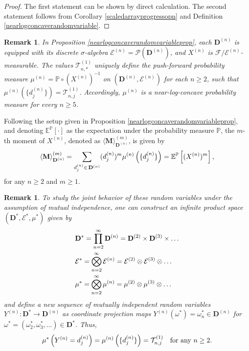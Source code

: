 \documentclass[a4paper,12pt]{article}
\newtheorem{rem}[thm]{Remark}
\def\P{\mathbb{P}}
\def\E{\mathbb{E}}
\def\T{\mathcal{T}}
\def\F{\mathcal{F}}
\begin{document}
\begin{proof}
The first statement can be shown by direct calculation. The second statement follows from Corollary \ref{scaledarrayprogressopn} and Definition \ref{nearlogconcaverandomvariable}.
\end{proof}
\begin{rem}
\label{probmeasure}
In Proposition \ref{nearlogconcaverandomvariableprop}, each $\mathbf{D}^{(n)}$ is equipped with its discrete $\sigma$-algebra $\mathcal{E}^{(n)} = \mathcal{P}(\mathbf{D}^{(n)})$, and $X^{(n)}$ is $\F/\mathcal{E}^{(n)}$-measurable. The values $\T^{(1)}_{n,*}$ uniquely define the push-forward probability measure $\mu^{(n)} = \P \circ (X^{(n)})^{-1}$ on $(\mathbf{D}^{(n)},\mathcal{E}^{(n)})$ for each $n \geq 2$, such that $\mu^{(n)}(\{d^{(n)}_j\}) = \T^{(1)}_{n,j}$. Accordingly, $\mu^{(n)}$ is a near-log-concave probability measure for every $n\geq 5$.
\end{rem}
Following the setup given in Proposition \ref{nearlogconcaverandomvariableprop}, and denoting $\E^{\P}[\cdot]$ as the expectation under the probability measure $\P$, the $m$-th moment of $X^{(n)}$, denoted as $\langle\textbf{M}\rangle_{\mathbf{D}^{(n)}}^{(m)}$, is given by
\begin{align} 
\langle\textbf{M}\rangle_{\mathbf{D}^{(n)}}^{(m)} = \sum_{d^{(n)}_j \in \, \mathbf{D}^{(n)}} (d^{(n)}_j)^m \mu^{(n)}\left( \{d^{(n)}_j\} \right) = \E^{\P}\left[ (X^{(n)})^m \right], \notag  \end{align}
for any $n\geq 2$ and $m\geq 1$. 
\begin{rem}
To study the joint behavior of these random variables under the assumption of mutual independence, one can construct an infinite product space $(\mathbf{D}^*, \mathcal{E}^*, \mu^*)$ given by 
\begin{align}
&\mathbf{D}^* = \prod_{n=2}^{\infty} \mathbf{D}^{(n)} = \mathbf{D}^{(2)} \times \mathbf{D}^{(3)} \times \ldots \notag \\
&\mathcal{E}^* = \bigotimes_{n=2}^{\infty} \mathcal{E}^{(n)} = \mathcal{E}^{(2)} \otimes \mathcal{E}^{(3)} \otimes \ldots \notag \\
&\mu^* = \bigotimes_{n=2}^{\infty} \mu^{(n)} = \mu^{(2)} \otimes \mu^{(3)} \otimes \ldots \notag
\end{align}
and define a new sequence of mutually independent random variables $Y^{(n)}: \mathbf{D}^* \rightarrow \mathbf{D}^{(n)}$ as coordinate projection maps $Y^{(n)}(\omega^*) = \omega^*_n \in \mathbf{D}^{(n)}$ for $\omega^* = (\omega^*_2, \omega^*_3, \dots) \in \mathbf{D}^*$. Thus, 
\begin{align}
\mu^*\left(Y^{(n)} = d^{(n)}_j\right) = \mu^{(n)}\left( \{d^{(n)}_j\} \right) = \T^{(1)}_{n,j} \quad \text{for any \(n \geq 2\)}. \notag
\end{align}
\end{rem}
\end{document}
